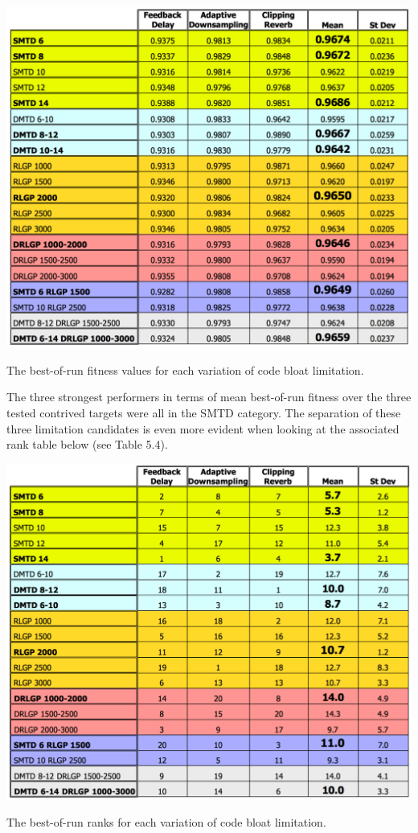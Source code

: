\documentclass[12pt]{report} 	%
\numberwithin{figure}{chapter}
\numberwithin{table}{chapter}
\numberwithin{equation}{chapter}
\begin{document}
\begin{flushleft}
\begin{table}[h!]
\begin{center}
\includegraphics[scale=0.6,width=\linewidth]{ResourceLimTable1}
\caption[Code bloat limitation best-of-run values]{The best-of-run fitness values for each variation of code bloat limitation.}
\end{center}
\end{table}

The three strongest performers in terms of mean best-of-run fitness over the three tested contrived targets were all in the SMTD category. The separation of these three limitation candidates is even more evident when looking at the associated rank table below (see Table 5.4).

\begin{table}[h!]
\begin{center}
\includegraphics[scale=0.6,width=\linewidth]{ResourceLimTable2}
\caption[Code bloat limitation best-of-run ranks]{The best-of-run ranks for each variation of code bloat limitation.}
\end{center}
\end{table}


\end{flushleft}
\end{document}
